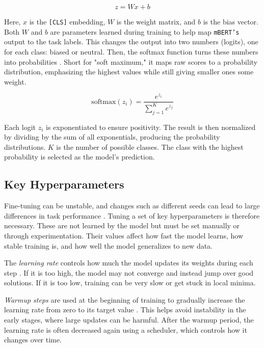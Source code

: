     \[
    z = Wx + b
    \]

    Here, \(x\) is the \texttt{[CLS]} embedding, \(W\) is the weight matrix, and \(b\) is the bias vector. Both \(W\) and \(b\) are parameters learned during training to help map \texttt{mBERT’s} output to the task labels. This changes the output into two numbers (logits), one for each class: biased or neutral. Then, the softmax function turns these numbers into probabilities \parencite{devlinBERTPretrainingDeep2019,xiaoIntroductionTransformersNLP2023}. Short for "soft maximum," it maps raw scores to a probability distribution, emphasizing the highest values while still giving smaller ones some weight.

    \[
    \text{softmax}(z_i) = \frac{e^{z_i}}{\sum_{j=1}^{K} e^{z_j}}
    \]

    Each logit \( z_i \) is exponentiated to ensure positivity. The result is then normalized by dividing by the sum of all exponentials, producing the probability distributions. \( K \) is the number of possible classes. The class with the highest probability is selected as the model’s prediction.
    
\subsection{Key Hyperparameters} \label{subsection:hyperparameters_explained}
    Fine-tuning can be unstable, and changes such as different seeds can lead to large differences in task performance \parencite{mosbachStabilityFinetuningBERT2021}. Tuning a set of key hyperparameters is therefore necessary. These are not learned by the model but must be set manually or through experimentation. Their values affect how fast the model learns, how stable training is, and how well the model generalizes to new data.

    The \textit{learning rate} controls how much the model updates its weights during each step \parencite{mosbachStabilityFinetuningBERT2021}. If it is too high, the model may not converge and instead jump over good solutions. If it is too low, training can be very slow or get stuck in local minima.

    \textit{Warmup steps} are used at the beginning of training to gradually increase the learning rate from zero to its target value \parencite{mosbachStabilityFinetuningBERT2021}. This helps avoid instability in the early stages, where large updates can be harmful. After the warmup period, the learning rate is often decreased again using a scheduler, which controls how it changes over time.

